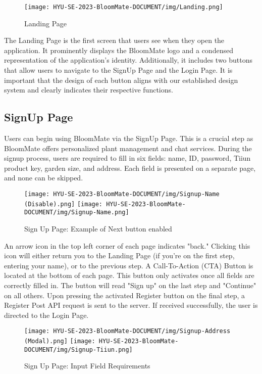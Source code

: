 \documentclass[conference, a4paper]{IEEEtran}
\begin{document}
\begin{figure}[h]
\centering
\texttt{[image: HYU-SE-2023-BloomMate-DOCUMENT/img/Landing.png]}
\label{fig:Landing}
\caption{Landing Page} 
\end{figure}

The Landing Page is the first screen that users see when they open the application. It prominently displays the BloomMate logo and a condensed representation of the application's identity. Additionally, it includes two buttons that allow users to navigate to the SignUp Page and the Login Page. It is important that the design of each button aligns with our established design system and clearly indicates their respective functions.

\subsection{SignUp Page}

Users can begin using BloomMate via the SignUp Page. This is a crucial step as BloomMate offers personalized plant management and chat services. During the signup process, users are required to fill in six fields: name, ID, password, Tiiun product key, garden size, and address. Each field is presented on a separate page, and none can be skipped.

   \begin{figure}[h]
    \centerline{
        \texttt{[image: HYU-SE-2023-BloomMate-DOCUMENT/img/Signup-Name (Disable).png]}
        \texttt{[image: HYU-SE-2023-BloomMate-DOCUMENT/img/Signup-Name.png]}
    }
    \label{fig}
    \caption{Sign Up Page: Example of Next button enabled}
    \end{figure}
    
An arrow icon in the top left corner of each page indicates "back." Clicking this icon will either return you to the Landing Page (if you're on the first step, entering your name), or to the previous step. A Call-To-Action (CTA) Button is located at the bottom of each page. This button only activates once all fields are correctly filled in. The button will read "Sign up" on the last step and "Continue" on all others. Upon pressing the activated Register button on the final step, a Register Post API request is sent to the server. If received successfully, the user is directed to the Login Page.


    \begin{figure}[h]
    \centerline{
        \texttt{[image: HYU-SE-2023-BloomMate-DOCUMENT/img/Signup-Address (Modal).png]}
        \texttt{[image: HYU-SE-2023-BloomMate-DOCUMENT/img/Signup-Tiiun.png]}
    }
    \label{fig}
    \caption{Sign Up Page: Input Field Requirements}
    \end{figure}
    
\end{document}
